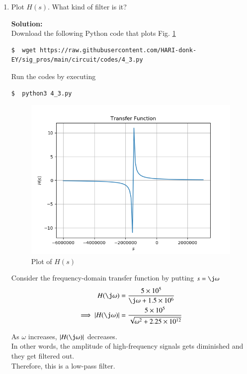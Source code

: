 \documentclass[journal,12pt,twocolumn]{IEEEtran}
\newcommand{\solution}{\noindent \textbf{Solution: }}
\providecommand{\abs}[1]{\left\vert#1\right\vert}
\numberwithin{equation}{section}
\numberwithin{figure}{section}
\renewcommand\thesection{\arabic{section}}
\begin{document}
\begin{enumerate}[label=\thesection.\arabic*,ref=\thesection.\theenumi]
		\item Plot $H(s)$.  What kind of filter is it?
	
		\solution\\
			Download the following Python code that plots Fig. \ref{fig:4.3}
			\begin{lstlisting}
$  wget https://raw.githubusercontent.com/HARI-donk-EY/sig_pros/main/circuit/codes/4_3.py
			\end{lstlisting}
	
			Run the codes by executing
			\begin{lstlisting} 
$  python3 4_3.py
			\end{lstlisting}	
			\begin{figure}[h]
				\begin{center}
					\includegraphics[width=0.7\columnwidth]{figs/4_3}
				\end{center}
				\caption{Plot of $H(s)$}
				\label{fig:4.3}
			\end{figure}

			Consider the frequency-domain transfer function by putting $s = \j\omega$
			\begin{align}
				H(\j\omega) &= \frac{5 \times 10^5}{\j\omega + 1.5 \times 10^6} \\
				\implies \abs{H(\j\omega)} &= \frac{5 \times 10^5}{\sqrt{\omega^2 + 2.25\times10^{12}}}
			\end{align}
	
			As $\omega$ increases, $\abs{H(\j\omega)}$ decreases.\\
	
			In other words, the amplitude of high-frequency signals gets diminished and they get filtered out.\\
	
			Therefore, this is a low-pass filter.\\


\end{enumerate}
\end{document}
